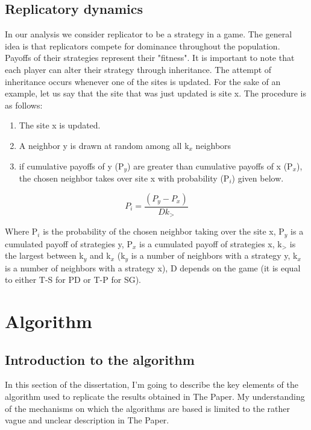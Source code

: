 \documentclass[english, twoside, 12pt, a4paper]{article}
\theoremstyle{definition}
\theoremstyle{plain}
\theoremstyle{remark}
\begin{document}
\subsection{Replicatory dynamics}

In our analysis we consider replicator to be a strategy in a game. The general idea is that replicators compete for dominance throughout the population. Payoffs of
their strategies represent their "fitness". It is important to note that each player can alter their strategy through inheritance. The attempt of inheritance occurs 
whenever one of the sites is updated. For the sake of an example, let us say that the site that was just updated is site x. The procedure is as follows:

\begin{enumerate}
  \item The site x is updated.
  \item A neighbor y is drawn at random among all k$_{x}$ neighbors
  \item if cumulative payoffs of y (P$_{y}$) are greater than cumulative payoffs of x (P$_{x}$), the chosen neighbor takes over site x with probability (P$_{i}$) given below.
\end{enumerate}


\begin{center}

\[
  P_{i} = \frac{(P_{y} - P_{x})}{Dk_{>}}
  \]
\end{center}
Where P$_{i}$ is the probability of the chosen neighbor taking over the site x, P$_{y}$ is a cumulated payoff of strategies y, P$_{x}$ is a cumulated payoff 
of strategies x, k$_{>}$ is the largest between k$_{y}$ and k$_{x}$ (k$_{y}$ is a number of neighbors with a strategy y, k$_{x}$ is a number of neighbors with a 
strategy x), D depends on the game (it is equal to either T-S for PD or T-P for SG).

\section{Algorithm}
\subsection{Introduction to the algorithm}
In this section of the dissertation, I'm going to describe the key elements of the algorithm used to replicate the results obtained in The Paper. 
My understanding of the mechanisms on which the algorithms are based is limited to the rather vague and unclear description in The Paper. 
\end{document}
